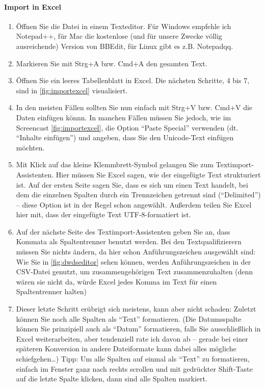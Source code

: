 \documentclass[]{article}
\let\oldparagraph\paragraph
\renewcommand{\paragraph}[1]{\oldparagraph{#1}\mbox{}}
\begin{document}
\hypertarget{import-in-excel}{\paragraph{Import in
Excel}\label{import-in-excel}}

\begin{enumerate}
\def\labelenumi{\arabic{enumi}.}
\item
  Öffnen Sie die Datei in einem Texteditor. Für Windows empfehle ich
  Notepad++, für Mac die kostenlose (und für unsere Zwecke völlig
  ausreichende) Version von BBEdit, für Linux gibt es z.B. Notepadqq.
\item
  Markieren Sie mit Strg+A bzw. Cmd+A den gesamten Text.
\item
  Öffnen Sie ein leeres Tabellenblatt in Excel. Die nächsten Schritte, 4
  bis 7, sind in \ref{fig:importexcel} visualisiert.
\item
  In den meisten Fällen sollten Sie nun einfach mit Strg+V bzw. Cmd+V
  die Daten einfügen könnn. In manchen Fällen müssen Sie jedoch, wie im
  Screencast \ref{fig:importexcel}, die Option \enquote{Paste Special}
  verwenden (dt. \enquote{Inhalte einfügen}) und angeben, dass Sie den
  Unicode-Text einfügen möchten.
\item
  Mit Klick auf das kleine Klemmbrett-Symbol gelangen Sie zum
  Textimport-Assistenten. Hier müssen Sie Excel sagen, wie der
  eingefügte Text strukturiert ist. Auf der ersten Seite sagen Sie, dass
  es sich um einen Text handelt, bei dem die einzelnen Spalten durch ein
  Trennzeichen getrennt sind (\enquote{Delimited}) -- diese Option ist
  in der Regel schon angewählt. Außerdem teilen Sie Excel hier mit, dass
  der eingefügte Text UTF-8-formatiert ist.
\item
  Auf der nächste Seite des Textimport-Assistenten geben Sie an, dass
  Kommata als Spaltentrenner benutzt werden. Bei den Textqualifizierern
  müssen Sie nichts ändern, da hier schon Anführungszeichen ausgewählt
  sind: Wie Sie in \ref{fig:dwdseditor} sehen können, werden
  Anführungszeichen in der CSV-Datei genutzt, um zusammengehörigen Text
  zusammenzuhalten (denn wären sie nicht da, würde Excel jedes Komma im
  Text für einen Spaltentrenner halten)
\item
  Dieser letzte Schritt erübrigt sich meistens, kann aber nicht schaden:
  Zuletzt können Sie noch alle Spalten als \enquote{Text} formatieren.
  (Die Datumsspalte können Sie prinzipiell auch als \enquote{Datum}
  formatieren, falls Sie ausschließlich in Excel weiterarbeiten, aber
  tendenziell rate ich davon ab -- gerade bei einer späteren Konversion
  in andere Dateiformate kann dabei alles mögliche schiefgehen\ldots{})
  Tipp: Um alle Spalten auf einmal als \enquote{Text} zu formatieren,
  einfach im Fenster ganz nach rechts scrollen und mit gedrückter
  Shift-Taste auf die letzte Spalte klicken, dann sind alle Spalten
  markiert.
\end{enumerate}
\end{document}
